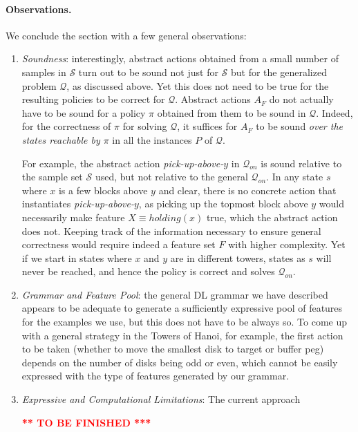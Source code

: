 \documentclass[letterpaper]{article} %
\newcommand{\alert}[1]{\textcolor{red}{\bf #1}}
\newcommand{\Q}{\mathcal{Q}}
\begin{document}
\paragraph{Observations.}
We conclude the section with a few general observations:

\begin{enumerate}
\item
\emph{Soundness}: interestingly, abstract actions obtained from a small number of samples in
$\mathcal{S}$ turn out to be sound not just for $\mathcal{S}$ but for the generalized problem $\Q$,
as discussed above. Yet this does not need to be true for the resulting policies to be
correct for $\Q$.
%
Abstract actions $A_F$ do not actually have to be sound for a policy $\pi$
obtained from them to be sound in $\Q$.
Indeed, for the correctness of $\pi$ for solving $\Q$,
it suffices for $A_F$ to be sound \emph{over the states reachable by $\pi$}
in all the instances $P$ of $\Q$.

For example, the abstract action \emph{pick-up-above-$y$} in $\Q_{on}$
is sound relative to the sample set $\mathcal{S}$ used, but not relative to the general
$\Q_{on}$. In any state $s$ where $x$ is a few blocks above $y$ and clear,
there is no concrete action that instantiates \emph{pick-up-above-$y$},
as picking up the topmost block above $y$ would necessarily make feature $X \equiv holding(x)$
true, which the abstract action does not.
%
Keeping track of the information necessary to ensure general correctness would require indeed
a feature set $F$ with higher complexity.
Yet if we start in states where $x$ and $y$ are in different towers,
states as $s$ will never be reached, and hence the policy is correct and solves $\Q_{on}$.


\item
\emph{Grammar and Feature Pool}: the general DL grammar we have described appears to be
adequate to generate a sufficiently expressive pool of features for the examples we use,
but this does not have to be always so.
To come up with a general strategy in the Towers of Hanoi, for example,
the first action to be taken  (whether to move the smallest disk to target or buffer peg)
depends on the number of disks being odd or even,
which cannot be easily expressed with the type of features generated by our grammar.

\item
\emph{Expressive and Computational Limitations}:
The current approach

\alert{*** TO BE FINISHED ***}


\end{enumerate}
\end{document}
